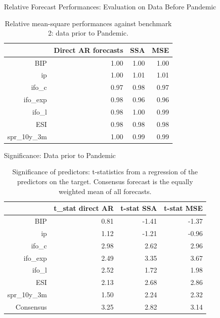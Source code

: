 \documentclass{beamer}
\begin{document}
\begin{frame} {Relative Forecast Performances: Evaluation on Data Before Pandemic}\label{rmse4}

\begin{table}[ht]
\centering
\begin{tabular}{rrrr}
  \hline
 & Direct AR forecasts & SSA & MSE \\ 
  \hline
BIP & 1.00 & 1.00 & 1.00 \\ 
  ip & 1.00 & 1.01 & 1.01 \\ 
  ifo\_c & 0.97 & 0.98 & 0.97 \\ 
  ifo\_exp & 0.98 & 0.96 & 0.96 \\ 
  ifo\_l & 0.98 & 1.00 & 0.99 \\ 
  ESI & 0.98 & 0.98 & 0.98 \\ 
  spr\_10y\_3m & 1.00 & 0.99 & 0.99 \\ 
   \hline
\end{tabular}
\caption{Relative mean-square performances against benchmark 2: data prior to Pandemic.} 
\label{perf_var1}
\end{table}\end{frame}



\begin{frame} {Significance: Data prior to Pandemic}\label{tstat2}

\begin{table}[ht]
\centering
\begin{tabular}{rrrr}
  \hline
 & t\_stat direct AR & t-stat SSA & t-stat MSE \\ 
  \hline
BIP & 0.81 & -1.41 & -1.37 \\ 
  ip & 1.12 & -1.21 & -0.96 \\ 
  ifo\_c & 2.98 & 2.62 & 2.96 \\ 
  ifo\_exp & 2.49 & 3.35 & 3.67 \\ 
  ifo\_l & 2.52 & 1.72 & 1.98 \\ 
  ESI & 2.13 & 2.68 & 2.86 \\ 
  spr\_10y\_3m & 1.50 & 2.24 & 2.32 \\ 
  Consensus & 3.25 & 2.82 & 3.14 \\ 
   \hline
\end{tabular}
\caption{Significance of predictors: t-statistics from a regression of the predictors on the target. Consensus forecast is the equally weighted mean of all forecasts.} 
\label{perf_var1}
\end{table}\end{frame}
\end{document}
